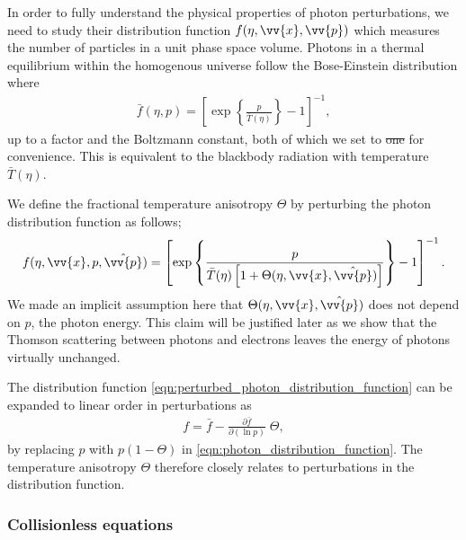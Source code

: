 \documentclass[a4paper,12pt,times,custombib,print,index]{Classes/PhDThesisPSnPDF} %
\providecommand{\DIFadd}[1]{{\protect\color{blue}\uwave{#1}}} %
\providecommand{\DIFdel}[1]{{\protect\color{red}\sout{#1}}}                      %
\providecommand{\DIFaddbegin}{} %
\providecommand{\DIFaddend}{} %
\providecommand{\DIFdelbegin}{} %
\providecommand{\DIFdelend}{} %
\newcommand{\DIFscaledelfig}{0.5}
\newlength{\DIFdelgraphicswidth} %
\newlength{\DIFdelgraphicsheight} %
\newcommand{\DIFaddincludegraphics}[2][]{{\color{blue}\fbox{\DIFOincludegraphics[#1]{#2}}}} %
\newcommand{\DIFdelincludegraphics}[2][]{%
\sbox{\DIFdelgraphicsbox}{\DIFOincludegraphics[#1]{#2}}%
\settoboxwidth{\DIFdelgraphicswidth}{\DIFdelgraphicsbox} %
\settoboxtotalheight{\DIFdelgraphicsheight}{\DIFdelgraphicsbox} %
\scalebox{\DIFscaledelfig}{%
\parbox[b]{\DIFdelgraphicswidth}{\usebox{\DIFdelgraphicsbox}\\[-\baselineskip] \rule{\DIFdelgraphicswidth}{0em}}\llap{\resizebox{\DIFdelgraphicswidth}{\DIFdelgraphicsheight}{%
\setlength{\unitlength}{\DIFdelgraphicswidth}%
\begin{picture}(1,1)%
\thicklines\linethickness{2pt} %
{\color[rgb]{1,0,0}\put(0,0){\framebox(1,1){}}}%
{\color[rgb]{1,0,0}\put(0,0){\line( 1,1){1}}}%
{\color[rgb]{1,0,0}\put(0,1){\line(1,-1){1}}}%
\end{picture}%
}\hspace*{3pt}}} %
} %
\DeclareRobustCommand{\DIFaddbegin}{\DIFOaddbegin \let\includegraphics\DIFaddincludegraphics} %
\DeclareRobustCommand{\DIFaddend}{\DIFOaddend \let\includegraphics\DIFOincludegraphics} %
\DeclareRobustCommand{\DIFdelbegin}{\DIFOdelbegin \let\includegraphics\DIFdelincludegraphics} %
\DeclareRobustCommand{\DIFdelend}{\DIFOaddend \let\includegraphics\DIFOincludegraphics} %
\begin{document}
In order to fully understand the physical properties of photon perturbations, we need to study their distribution function $f(\eta,\vv{x},\vv{p})$ which measures the number of particles in a unit phase space volume. Photons in a thermal equilibrium within the homogenous universe follow the Bose-Einstein distribution where   
\begin{align}
	\bar{f}(\eta, p) = \left[ \exp \left\{ \frac{p}{\bar{T}(\eta)} \right\} - 1 \right]^{-1}, \label{eqn:photon_distribution_function}
\end{align}
up to a factor and the Boltzmann constant, both of which we set to \DIFdelbegin \DIFdel{one }\DIFdelend \DIFaddbegin \DIFadd{$1$ }\DIFaddend for convenience. This is equivalent to the blackbody radiation with temperature $\bar{T}(\eta)$.

We define the fractional temperature anisotropy $\Theta$ by perturbing the photon distribution function as follows;
\begin{align}
	f(\eta, \vv{x}, p, \hat{\vv{p}}) = \left[ \exp \left\{ \frac{p}{\bar{T}(\eta)\left[1 + \Theta (\eta,\vv{x},\hat{\vv{p}}) \right]} \right\} - 1 \right]^{-1}. \label{eqn:perturbed_photon_distribution_function}
\end{align}
We \DIFaddbegin \DIFadd{have }\DIFaddend made an implicit assumption here that $\Theta(\eta,\vv{x},\hat{\vv{p}})$ does not depend on $p$, the photon energy. This claim will be justified later as we show that the Thomson scattering between photons and electrons leaves the energy of photons virtually unchanged.

The distribution function \eqref{eqn:perturbed_photon_distribution_function} can be expanded to linear order in perturbations as
\begin{align}
	f = \bar{f} - \frac{\partial \bar{f}}{\partial (\ln p)} \; \Theta,  \label{eqn:perturbed_photon_distribution_function_expansion}
\end{align}
by replacing $p$ with $p(1-\Theta)$ in \eqref{eqn:photon_distribution_function}. The temperature anisotropy $\Theta$ therefore closely relates to perturbations in the distribution function.

\subsubsection*{Collisionless equations} \label{section:collisionless_equation}
\end{document}
